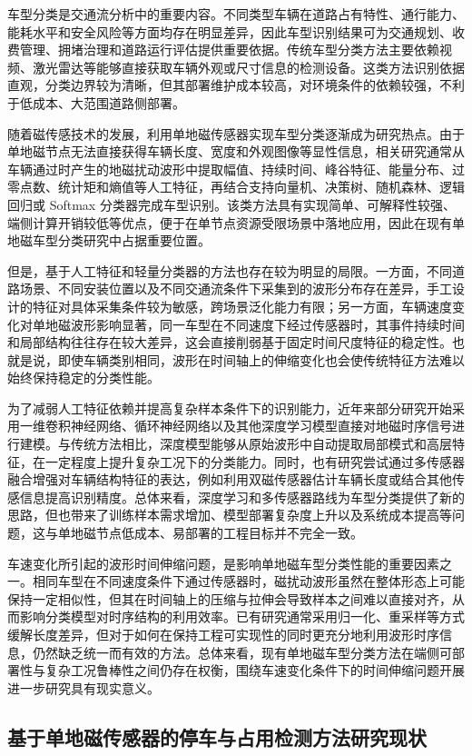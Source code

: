 车型分类是交通流分析中的重要内容。不同类型车辆在道路占有特性、通行能力、能耗水平和安全风险等方面均存在明显差异，因此车型识别结果可为交通规划、收费管理、拥堵治理和道路运行评估提供重要依据。传统车型分类方法主要依赖视频、激光雷达等能够直接获取车辆外观或尺寸信息的检测设备。这类方法识别依据直观，分类边界较为清晰，但其部署维护成本较高，对环境条件的依赖较强，不利于低成本、大范围道路侧部署。

随着磁传感技术的发展，利用单地磁传感器实现车型分类逐渐成为研究热点。由于单地磁节点无法直接获得车辆长度、宽度和外观图像等显性信息，相关研究通常从车辆通过时产生的地磁扰动波形中提取幅值、持续时间、峰谷特征、能量分布、过零点数、统计矩和熵值等人工特征，再结合支持向量机、决策树、随机森林、逻辑回归或 Softmax 分类器完成车型识别。该类方法具有实现简单、可解释性较强、端侧计算开销较低等优点，便于在单节点资源受限场景中落地应用，因此在现有单地磁车型分类研究中占据重要位置。

但是，基于人工特征和轻量分类器的方法也存在较为明显的局限。一方面，不同道路场景、不同安装位置以及不同交通流条件下采集到的波形分布存在差异，手工设计的特征对具体采集条件较为敏感，跨场景泛化能力有限；另一方面，车辆速度变化对单地磁波形影响显著，同一车型在不同速度下经过传感器时，其事件持续时间和局部结构往往存在较大差异，这会直接削弱基于固定时间尺度特征的稳定性。也就是说，即使车辆类别相同，波形在时间轴上的伸缩变化也会使传统特征方法难以始终保持稳定的分类性能。

为了减弱人工特征依赖并提高复杂样本条件下的识别能力，近年来部分研究开始采用一维卷积神经网络、循环神经网络以及其他深度学习模型直接对地磁时序信号进行建模。与传统方法相比，深度模型能够从原始波形中自动提取局部模式和高层特征，在一定程度上提升复杂工况下的分类能力。同时，也有研究尝试通过多传感器融合增强对车辆结构特征的表达，例如利用双磁传感器估计车辆长度或结合其他传感信息提高识别精度。总体来看，深度学习和多传感器路线为车型分类提供了新的思路，但也带来了训练样本需求增加、模型部署复杂度上升以及系统成本提高等问题，这与单地磁节点低成本、易部署的工程目标并不完全一致。

车速变化所引起的波形时间伸缩问题，是影响单地磁车型分类性能的重要因素之一。相同车型在不同速度条件下通过传感器时，磁扰动波形虽然在整体形态上可能保持一定相似性，但其在时间轴上的压缩与拉伸会导致样本之间难以直接对齐，从而影响分类模型对时序结构的利用效率。已有研究通常采用归一化、重采样等方式缓解长度差异，但对于如何在保持工程可实现性的同时更充分地利用波形时序信息，仍然缺乏统一而有效的方法。总体来看，现有单地磁车型分类方法在端侧可部署性与复杂工况鲁棒性之间仍存在权衡，围绕车速变化条件下的时间伸缩问题开展进一步研究具有现实意义。

\subsection{基于单地磁传感器的停车与占用检测方法研究现状}
\label{sec:related_parking_detection}

